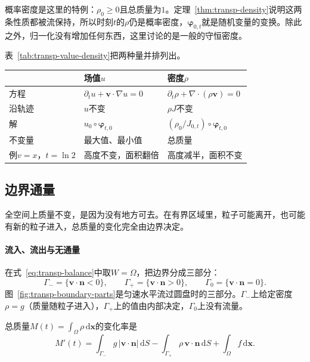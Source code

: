 概率密度是这里的特例：$\rho_0\geq0$且总质量为$1$。定理~\ref{thm:transp-density}说明这两条性质都被流保持，所以时刻$t$的$\rho$仍是概率密度，$\bm{\varphi}_{0,t}$就是随机变量的变换。除此之外，归一化没有增加任何东西，这里讨论的是一般的守恒密度。

表~\ref{tab:transp-value-density}把两种量并排列出。

\begin{BookInlineTable}
  \centering
  \caption{沿轨迹的场值与密度的比较。设$\bm{v}$满足条件（V），无源项。}
  \label{tab:transp-value-density}
  \begin{tabular}{p{16mm}p{42mm}p{42mm}}
    \toprule
    & 场值$u$ & 密度$\rho$ \\
    \midrule
    方程 & $\partial_tu+\bm{v}\cdot\nabla u=0$ & $\partial_t\rho+\nabla\cdot(\rho\bm{v})=0$ \\
    沿轨迹 & $u$不变 & $\rho J$不变 \\
    解 & $u_0\circ\bm{\varphi}_{t,0}$ & $(\rho_0/J_{0,t})\circ\bm{\varphi}_{t,0}$ \\
    不变量 & 最大值、最小值 & 总质量 \\
    例$v=x$，$t=\ln2$ & 高度不变，面积翻倍 & 高度减半，面积不变 \\
    \bottomrule
  \end{tabular}
\end{BookInlineTable}

\subsection{边界通量}
\label{sec:transp-boundary-flux}

全空间上质量不变，是因为没有地方可去。在有界区域里，粒子可能离开，也可能有新的粒子进入，总质量的变化完全由边界决定。

\paragraph{流入、流出与无通量}
在式~\eqref{eq:transp-balance}中取$W=\Omega$，把边界分成三部分：
\begin{equation}
  \Gamma_{-}=\{\bm{v}\cdot\bm{n}<0\},\qquad
  \Gamma_{+}=\{\bm{v}\cdot\bm{n}>0\},\qquad
  \Gamma_{0}=\{\bm{v}\cdot\bm{n}=0\}.
  \label{eq:transp-boundary-parts}
\end{equation}
图~\ref{fig:transp-boundary-parts}是匀速水平流过圆盘时的三部分。$\Gamma_{-}$上给定密度$\rho=g$（质量随粒子进入），$\Gamma_{+}$上的值由内部决定，$\Gamma_{0}$上没有流量。

总质量$M(t)=\int_\Omega\rho\,\mathrm{d}\bm{x}$的变化率是
\begin{equation}
  M'(t)=\int_{\Gamma_{-}}g\,\lvert\bm{v}\cdot\bm{n}\rvert\,\mathrm{d}S
  -\int_{\Gamma_{+}}\rho\,\bm{v}\cdot\bm{n}\,\mathrm{d}S
  +\int_\Omega f\,\mathrm{d}\bm{x}.
  \label{eq:transp-mass-rate}
\end{equation}

